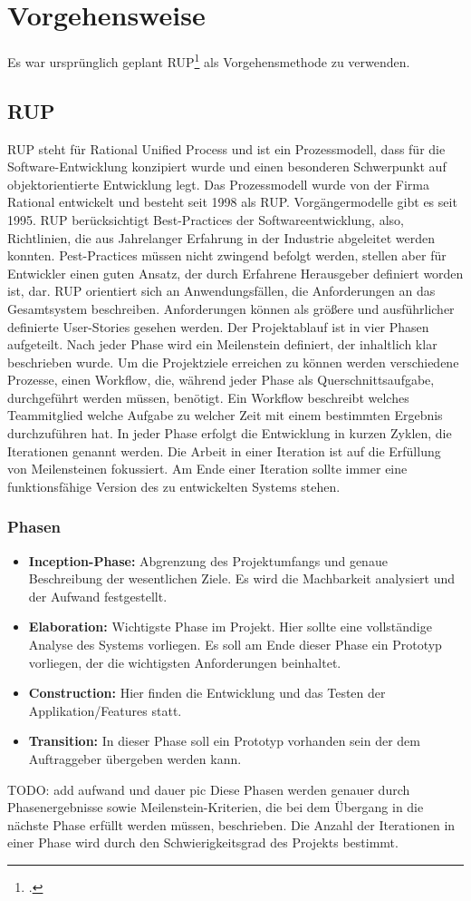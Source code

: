 \chapter{Vorgehensweise}
\reiter
Es war ursprünglich geplant RUP\footcite{rup} als Vorgehensmethode zu verwenden. 
\section{RUP}
RUP steht für Rational Unified Process und ist ein Prozessmodell, dass für die Software-Entwicklung konzipiert wurde und einen besonderen Schwerpunkt auf objektorientierte Entwicklung legt. Das Prozessmodell wurde von der Firma Rational entwickelt und besteht seit 1998 als RUP. Vorgängermodelle gibt es seit 1995. 
RUP berücksichtigt Best-Practices der Softwareentwicklung, also, Richtlinien, die aus Jahrelanger Erfahrung in der Industrie abgeleitet werden konnten. Pest-Practices müssen nicht zwingend befolgt werden, stellen aber für Entwickler einen guten Ansatz, der durch Erfahrene Herausgeber definiert worden ist, dar. 
RUP orientiert sich an Anwendungsfällen, die Anforderungen an das Gesamtsystem beschreiben. Anforderungen können als größere und ausführlicher definierte User-Stories gesehen werden.  
Der Projektablauf ist in vier Phasen aufgeteilt. Nach jeder Phase wird ein Meilenstein definiert, der inhaltlich klar beschrieben wurde.
Um die Projektziele erreichen zu können werden verschiedene Prozesse, einen Workflow, die, während jeder Phase als Querschnittsaufgabe, durchgeführt werden müssen, benötigt. Ein Workflow beschreibt welches Teammitglied welche Aufgabe zu welcher Zeit mit einem bestimmten Ergebnis durchzuführen hat.
In jeder Phase erfolgt die Entwicklung in kurzen Zyklen, die Iterationen genannt werden. Die Arbeit in einer Iteration ist auf die Erfüllung von Meilensteinen fokussiert. Am Ende einer Iteration sollte immer eine funktionsfähige Version des zu entwickelten Systems stehen. 
\subsection{Phasen}
\begin{itemize}
	\item \textbf{Inception-Phase:} Abgrenzung des Projektumfangs und genaue Beschreibung der wesentlichen Ziele. Es wird die Machbarkeit analysiert und der Aufwand festgestellt.
	\item \textbf{Elaboration:} Wichtigste Phase im Projekt. Hier sollte eine vollständige Analyse des Systems vorliegen. Es soll am Ende dieser Phase ein Prototyp vorliegen, der die wichtigsten Anforderungen beinhaltet.
	\item \textbf{Construction:} Hier finden die Entwicklung und das Testen der Applikation/Features statt.
	\item \textbf{Transition:} In dieser Phase soll ein Prototyp vorhanden sein der dem Auftraggeber übergeben werden kann. 
\end{itemize}
TODO: add aufwand und dauer pic
Diese Phasen werden genauer durch Phasenergebnisse sowie Meilenstein-Kriterien, die bei dem Übergang in die nächste Phase erfüllt werden müssen, beschrieben.
Die Anzahl der Iterationen in einer Phase wird durch den Schwierigkeitsgrad des Projekts bestimmt. 

